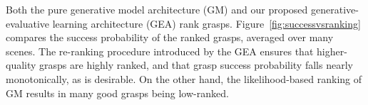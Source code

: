 Both the pure generative model architecture (GM) and our proposed generative-evaluative learning architecture (GEA) rank grasps. Figure~\ref{fig:successvsranking} compares the success probability of the ranked grasps, averaged over many scenes. The re-ranking procedure introduced by the GEA ensures that higher-quality grasps are highly ranked, and that grasp success probability falls nearly monotonically, as is desirable. On the other hand, the likelihood-based ranking of GM results in many good grasps being low-ranked. 



%
